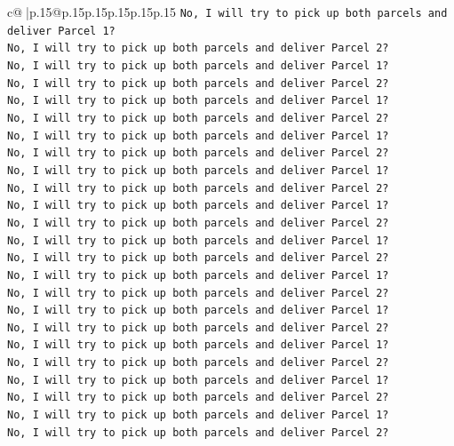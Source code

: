 \documentclass{article}
\begin{document}
{\begin{supertabular}{c@{$\;$}|p{.15\linewidth}@{}p{.15\linewidth}p{.15\linewidth}p{.15\linewidth}p{.15\linewidth}p{.15\linewidth}}
{{{\texttt{No, I will try to pick up both parcels and deliver Parcel 1?} \\
\texttt{No, I will try to pick up both parcels and deliver Parcel 2?} \\
\texttt{No, I will try to pick up both parcels and deliver Parcel 1?} \\
\texttt{No, I will try to pick up both parcels and deliver Parcel 2?} \\
\texttt{No, I will try to pick up both parcels and deliver Parcel 1?} \\
\texttt{No, I will try to pick up both parcels and deliver Parcel 2?} \\
\texttt{No, I will try to pick up both parcels and deliver Parcel 1?} \\
\texttt{No, I will try to pick up both parcels and deliver Parcel 2?} \\
\texttt{No, I will try to pick up both parcels and deliver Parcel 1?} \\
\texttt{No, I will try to pick up both parcels and deliver Parcel 2?} \\
\texttt{No, I will try to pick up both parcels and deliver Parcel 1?} \\
\texttt{No, I will try to pick up both parcels and deliver Parcel 2?} \\
\texttt{No, I will try to pick up both parcels and deliver Parcel 1?} \\
\texttt{No, I will try to pick up both parcels and deliver Parcel 2?} \\
\texttt{No, I will try to pick up both parcels and deliver Parcel 1?} \\
\texttt{No, I will try to pick up both parcels and deliver Parcel 2?} \\
\texttt{No, I will try to pick up both parcels and deliver Parcel 1?} \\
\texttt{No, I will try to pick up both parcels and deliver Parcel 2?} \\
\texttt{No, I will try to pick up both parcels and deliver Parcel 1?} \\
\texttt{No, I will try to pick up both parcels and deliver Parcel 2?} \\
\texttt{No, I will try to pick up both parcels and deliver Parcel 1?} \\
\texttt{No, I will try to pick up both parcels and deliver Parcel 2?} \\
\texttt{No, I will try to pick up both parcels and deliver Parcel 1?} \\
\texttt{No, I will try to pick up both parcels and deliver Parcel 2?} \\
}}}
\end{supertabular}}
\end{document}
